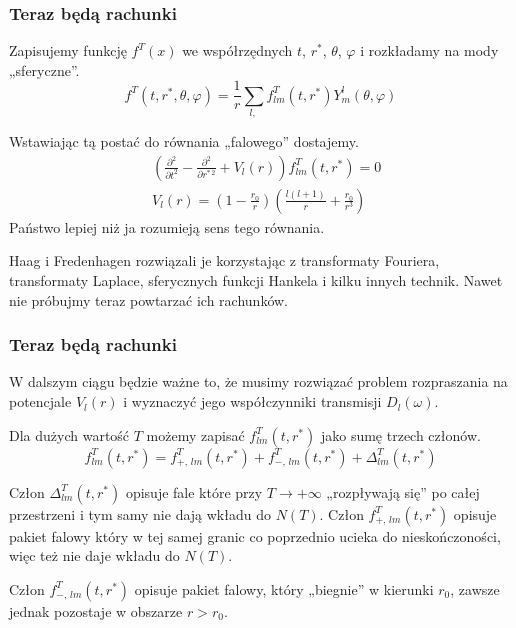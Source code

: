 \documentclass[10pt,t]{beamer}
\begin{document}
\begin{frame}
  \frametitle{Teraz będą rachunki}


  Zapisujemy funkcję $f^{ T }( x )$ we współrzędnych $t$, $r^{ * }$,
  $\theta$, $\varphi$ i rozkładamy na mody „sferyczne”.
  \begin{equation}
    \label{eq:Promieniowanie-Hawkinga-29}
    f^{ T }( t, r^{ * }, \theta, \varphi ) =
    \frac{ 1 }{ r }
    \sum_{ l,\, } f^{ T }_{ lm }( t, r^{ * } ) Y^{ l }_{ m }( \theta, \varphi )
  \end{equation}

  Wstawiając tą postać do równania „falowego” dostajemy.
  \begin{align}
    \label{eq:Promieniowanie-Hawkinga-30-A}
    &( \frac{ \partial^{ 2 } }{ \partial t^{ 2 } } - \frac{ \partial^{ 2 } }{ \partial r^{ *\, 2 } }
      + V_{ l }( r ) ) f^{ T }_{ lm }( t, r^{ * } ) = 0 \\
    \label{eq:Promieniowanie-Hawkinga-30-B}
    &V_{ l }( r ) =
      ( 1 - \frac{ r_{ 0 } }{ r } ) ( \frac{ l ( l + 1 ) }{ r }
      + \frac{ r_{ 0 } }{ r^{ 3 } })
  \end{align}
  Państwo lepiej niż ja rozumieją sens tego równania.

  Haag i Fredenhagen rozwiązali je korzystając z transformaty
  Fouriera, transformaty Laplace, sferycznych funkcji Hankela i kilku
  innych technik. Nawet nie próbujmy teraz powtarzać ich rachunków.

\end{frame}





\begin{frame}
  \frametitle{Teraz będą rachunki}


  W dalszym ciągu będzie ważne to, że musimy rozwiązać problem
  rozpraszania na potencjale $V_{ l }( r )$ i wyznaczyć jego
  współczynniki transmisji $D_{ l }( \omega )$.

  Dla dużych wartość $T$ możemy zapisać
  $f^{ T }_{ l m }( t, r^{ * } )$ jako sumę trzech członów.
  \begin{equation}
    \label{eq:Promieniowanie-Hawkinga-31}
    f^{ T }_{ l m }( t, r^{ * } ) =
    f^{ T }_{ +,\, l m }( t, r^{ * } ) + f^{ T }_{ -,\, l m }( t, r^{ * } )
    + \Delta_{ lm }^{ T }( t, r^{ * } )
  \end{equation}

  Człon $\Delta_{ lm }^{ T }( t, r^{ * } )$ opisuje fale które przy
  $T \to +\infty$ „rozpływają się” po całej przestrzeni i tym samy nie
  dają wkładu do $N( T )$. Człon $f_{ +,\, lm }^{ T }( t, r^{ * } )$
  opisuje pakiet falowy który w tej samej granic co poprzednio ucieka
  do nieskończoności, więc też nie daje wkładu do $N( T )$.

  Człon $f_{ -,\, lm }^{ T }( t, r^{ * } )$ opisuje pakiet falowy,
  który „biegnie” w kierunki $r_{ 0 }$, zawsze jednak pozostaje w
  obszarze $r > r_{ 0 }$.

\end{frame}
\end{document}
